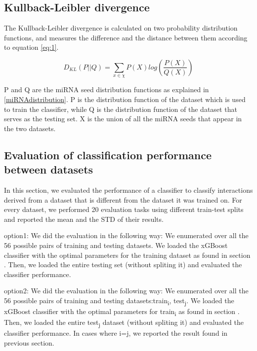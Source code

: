 \documentclass{bmcart}
\begin{document}
\subsection*{Kullback-Leibler divergence}
The Kullback-Leibler divergence is calculated on two probability distribution functions, and measures the difference and the distance between them according to equation \ref{eq:1}.

\begin{equation}
 D_{KL} \left (P ||Q \right ) = \sum_{x\in \chi }{P\left ( X \right )log\left ( \frac{P\left ( X \right )}{Q\left ( X \right )} \right )}\label{eq:1}
\end{equation}

P and Q are the miRNA seed distribution functions as explained in \ref{miRNAdistribution}. P is the distribution function of the dataset which is used to train the classifier, while Q is the distribution function of the dataset that serves as the testing set. X is the union of all the miRNA seeds that appear in the two datasets.

\subsection*{Evaluation of classification performance between datasets}
In this section, we evaluated the performance of a classifier to classify interactions derived from a dataset that is different from the dataset it was trained on. For every dataset, we performed 20 evaluation tasks  using different train-test splits and reported the mean and the STD of their results. 

option1: We did the evaluation in the following way: We enumerated over all the 56 possible pairs of training and testing datasets. We loaded the xGBoost classifier with the optimal parameters for the training dataset as found in section . Then, we loaded the entire testing set (without spliting it) and evaluated the classifier performance. 

option2: We did the evaluation in the following way: We enumerated over all the 56 possible pairs of training and testing datasets:train\textsubscript{i}, test\textsubscript{j}. We loaded the xGBoost classifier with the optimal parameters for train\textsubscript{i} as found in section . Then, we loaded the entire test\textsubscript{j} dataset (without spliting it) and evaluated the classifier performance. In cases where i=j,  we reported the result found in previous section.
\end{document}
